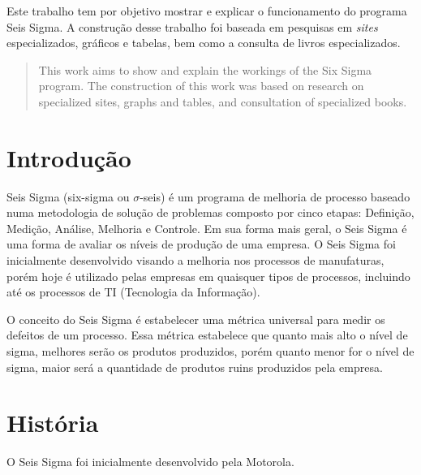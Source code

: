 \documentclass{abnt}
\begin{document}
	\capa
	
	\folhaderosto
	
	\begin{resumo}
		Este trabalho tem por objetivo mostrar e explicar o funcionamento do programa Seis Sigma. A construção 
		desse trabalho foi baseada em pesquisas em \textit{sites} especializados, gráficos e tabelas, bem como a consulta 
		de livros especializados.
	\end{resumo}

	\begin{abstract}
			This work aims to show and explain the workings of the Six Sigma program. The construction of this work 
			was based on research on specialized sites, graphs and tables, and consultation of specialized books.
	\end{abstract}
	
	\sumario
	
	\chapter {Introdução}
	
	Seis Sigma (six-sigma ou $\sigma$-seis) é um programa de melhoria de processo baseado numa 
	metodologia de solução de problemas composto por cinco etapas: Definição, Medição, Análise, 
	Melhoria e Controle. Em sua forma mais geral, o Seis Sigma é uma forma de avaliar os níveis 
	de produção de uma empresa. O Seis Sigma foi inicialmente desenvolvido visando a melhoria nos 
	processos de manufaturas, porém hoje é utilizado pelas empresas em quaisquer tipos de processos, 
	incluindo até os processos de TI (Tecnologia da Informação).
	
	O conceito do Seis Sigma é estabelecer uma métrica universal para medir os defeitos de um processo. 
	Essa métrica estabelece que quanto mais alto o nível de sigma, melhores serão os produtos produzidos, 
	porém quanto menor for o nível de sigma, maior será a quantidade de produtos ruins produzidos pela empresa.
	
	\chapter {História}
	
	O Seis Sigma foi inicialmente desenvolvido pela Motorola.
	
\end{document}
